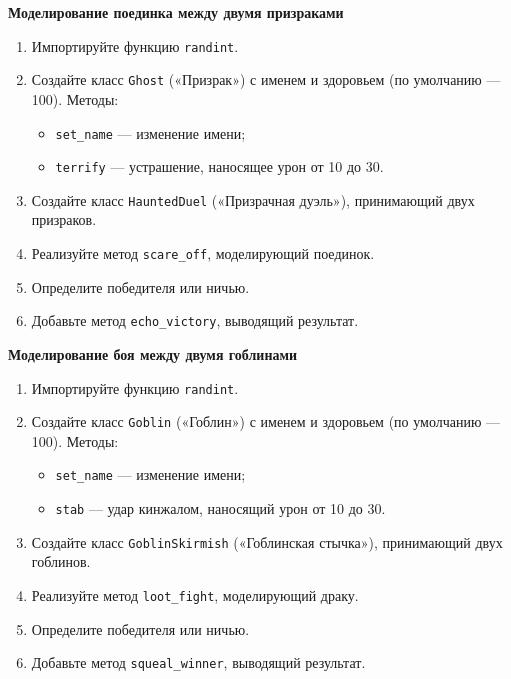 \item \textbf{Моделирование поединка между двумя призраками}

\begin{enumerate}
    \item Импортируйте функцию \texttt{randint}.

    \item Создайте класс \texttt{Ghost} («Призрак») с именем и здоровьем (по умолчанию — 100).  
    Методы:
    \begin{itemize}
        \item \texttt{set\_name} — изменение имени;
        \item \texttt{terrify} — устрашение, наносящее урон от 10 до 30.
    \end{itemize}

    \item Создайте класс \texttt{HauntedDuel} («Призрачная дуэль»), принимающий двух призраков.

    \item Реализуйте метод \texttt{scare\_off}, моделирующий поединок.

    \item Определите победителя или ничью.

    \item Добавьте метод \texttt{echo\_victory}, выводящий результат.
\end{enumerate}

\item \textbf{Моделирование боя между двумя гоблинами}

\begin{enumerate}
    \item Импортируйте функцию \texttt{randint}.

    \item Создайте класс \texttt{Goblin} («Гоблин») с именем и здоровьем (по умолчанию — 100).  
    Методы:
    \begin{itemize}
        \item \texttt{set\_name} — изменение имени;
        \item \texttt{stab} — удар кинжалом, наносящий урон от 10 до 30.
    \end{itemize}

    \item Создайте класс \texttt{GoblinSkirmish} («Гоблинская стычка»), принимающий двух гоблинов.

    \item Реализуйте метод \texttt{loot\_fight}, моделирующий драку.

    \item Определите победителя или ничью.

    \item Добавьте метод \texttt{squeal\_winner}, выводящий результат.
\end{enumerate}

